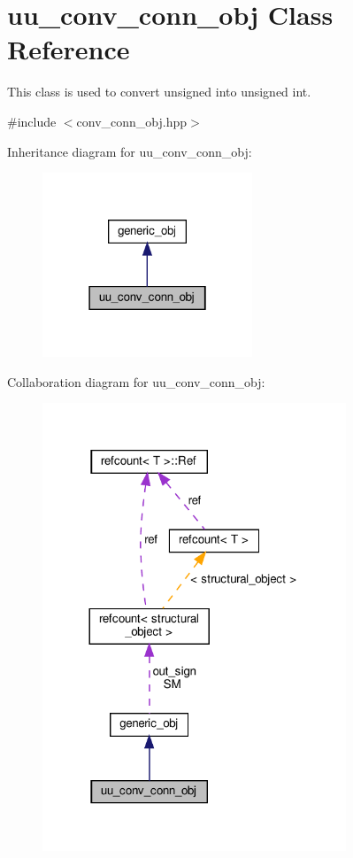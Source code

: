 \hypertarget{classuu__conv__conn__obj}{}\section{uu\+\_\+conv\+\_\+conn\+\_\+obj Class Reference}
\label{classuu__conv__conn__obj}


This class is used to convert unsigned into unsigned int.  




{\ttfamily \#include $<$conv\+\_\+conn\+\_\+obj.\+hpp$>$}



Inheritance diagram for uu\+\_\+conv\+\_\+conn\+\_\+obj\+:
\nopagebreak
\begin{figure}[H]
\begin{center}
\leavevmode
\includegraphics[width=178pt]{d8/db9/classuu__conv__conn__obj__inherit__graph}
\end{center}
\end{figure}


Collaboration diagram for uu\+\_\+conv\+\_\+conn\+\_\+obj\+:
\nopagebreak
\begin{figure}[H]
\begin{center}
\leavevmode
\includegraphics[width=257pt]{dd/dbc/classuu__conv__conn__obj__coll__graph}
\end{center}
\end{figure}
